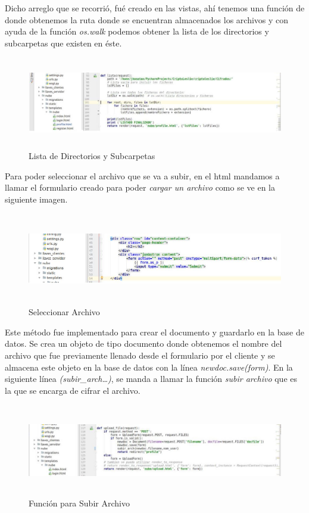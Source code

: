 Dicho arreglo que se recorrió, fué creado en las vistas, ahí tenemos una función de donde obtenemos la ruta donde se encuentran almacenados los archivos y con ayuda de la función \textit{os.walk} podemos obtener la lista de los directorios y subcarpetas que existen en éste.
			\begin{figure}[H]
			\centering
			\includegraphics[width=17cm, height=4cm]{./images/Interfaz/04.jpg}
			\caption{Lista de Directorios y Subcarpetas}
			\label{fig:6-4-4} 
			\end{figure} 

Para poder seleccionar el archivo que se va a subir, en el html mandamos a llamar el formulario creado para poder \textit{cargar un archivo} como se ve en la siguiente imagen.
			\begin{figure}[H]
			\centering
			\includegraphics[width=17cm, height=4cm]{./images/Interfaz/05.jpg}
			\caption{Seleccionar Archivo}
			\label{fig:6-4-5} 
			\end{figure} 


Este método fue implementado para crear el documento y guardarlo en la base de datos. Se crea un objeto de tipo documento donde obtenemos el nombre del archivo que fue previamente llenado desde el formulario por el cliente y se almacena este objeto en la base de datos con la línea \textit{newdoc.save(form)}.
En la siguiente línea \textit{(subir\_arch…)}, se manda a llamar la función \textit{subir archivo} que es la que se encarga de cifrar el archivo.

			\begin{figure}[H]
			\centering
			\includegraphics[width=17cm, height=4cm]{./images/Interfaz/06.jpg}
			\caption{Función para Subir Archivo}
			\label{fig:6-4-6} 
			\end{figure} 




